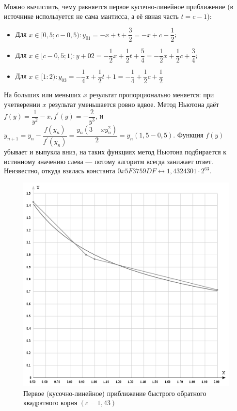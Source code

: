 \documentclass{book}
\begin{document}
Можно вычислить, чему равняется первое кусочно-линейное приближение (в источнике используется не сама мантисса, а её явная часть $ t=c-1$):
\begin{itemize}
    \item Для $x\in [0,5;c-0,5): y_{01}=-x+t+\dfrac{3}{2}=-x+c+\dfrac{1}{2}$;
    \item Для $x\in [c-0,5;1): y+{02}=-\dfrac{1}{2}x+\dfrac{1}{2}t+\dfrac{5}{4}=-\dfrac{1}{2}x+\dfrac{1}{2}c+\dfrac{3}{4}$;
    \item Для $x\in [1:2): y_{03}=-\dfrac{1}{4}x+\dfrac{1}{2}t+1=-\dfrac{1}{4}+\dfrac{1}{2}c+\dfrac{1}{2}$
\end{itemize}
На больших или меньших $x$ результат пропорционально меняется: при учетверении $x$ результат уменьшается ровно вдвое.
Метод Ньютона даёт $f(y)=\dfrac{1}{y^{2}}-x,f^{'}(y)=-\dfrac{2}{y^{3}}$, и $y_{n+1}=y_{n}-\dfrac{f(y_n)}{f^{'}(y_n)}=\dfrac{y_{n}(3-xy^{2}_{n})}{2}=y_{n}(1,5-0,5)$. Функция $f(y)$ убывает и выпукла вниз, на таких функциях метод Ньютона подбирается к истинному значению слева — потому алгоритм всегда занижает ответ.
Неизвестно, откуда взялась константа $0x5F3759DF \leftrightarrow 1,4324301·2^{63}$.

 \begin{figure}
    \centering
    \includegraphics[scale=0.3]{pics/495px-Fast_inverse_square_root_linear_approximation.svg.png}
    \caption{Первое (кусочно-линейное) приближение быстрого обратного квадратного корня $(c = 1,43)$}
\end{figure}
\end{document}
